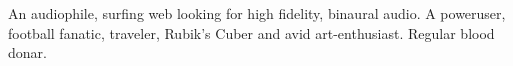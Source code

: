 

\begin{cvparagraph}

  An audiophile, surfing web looking for high fidelity, binaural audio.
  A poweruser, football fanatic, traveler, Rubik's Cuber and avid art-enthusiast.
  Regular blood donar.
\end{cvparagraph}  
